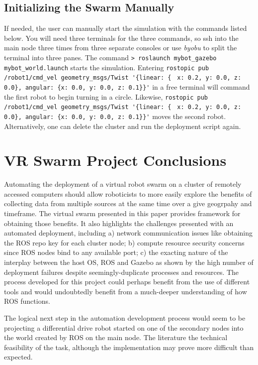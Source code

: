 \documentclass[9pt,twocolumn,twoside]{../../styles/osajnl}
\begin{document}
\subsection{Initializing the Swarm Manually}
If needed, the user can manually start the simulation with the commands listed below.  You will need three terminals for the three commands, so ssh into the main node three times from three separate consoles or use \textit{byobu} to split the terminal into three panes.  The command {\color{green} \lstinline[style=BashInputStyle]!> roslaunch mybot_gazebo mybot_world.launch! } starts the simulation.  Entering {\color{green} \lstinline[style=BashInputStyle]!rostopic pub /robot1/cmd_vel geometry_msgs/Twist '{linear: { !} {\color{green} \lstinline[style=BashInputStyle]!x: 0.2, y: 0.0, z: 0.0}, angular: {x: 0.0, y: 0.0, z: 0.1}}'! } \newline in a free terminal will command the first robot to begin turning in a circle.  Likewise, {\color{green} \lstinline[style=BashInputStyle]!rostopic pub /robot1/cmd_vel geometry_msgs/Twist '{linear: { !} {\color{green} \lstinline[style=BashInputStyle]!x: 0.2, y: 0.0, z: 0.0}, angular: {x: 0.0, y: 0.0, z: 0.1}}'! } \newline moves the second robot. Alternatively, one can delete the cluster and run the deployment script again.

\section{VR Swarm Project Conclusions}
Automating the deployment of a virtual robot swarm on a cluster of remotely accessed computers should allow roboticists to more easily explore the benefits of collecting data from multiple sources at the same time over a give geogrpahy and timeframe.  The virtual swarm presented in this paper provides framework for obtaining those benefits. It also highlights the challenges presented with an automated deployment, including a) network communication issues like obtaining the ROS repo key for each cluster node; b) compute resource security concerns since ROS nodes bind to any available port; c) the exacting nature of the interplay between the host OS, ROS and Gazebo as shown by the high number of deployment failures despite seemingly-duplicate processes and resources.  The process developed for this project could perhaps benefit from the use of different tools and would undoubtedly benefit from a much-deeper understanding of how ROS functions.

The logical next step in the automation development process would seem to be projecting a differential drive robot started on one of the secondary nodes into the world created by ROS on the main node.  The literature the technical feasibility of the task, although the implementation may prove more difficult than expected.
\end{document}
